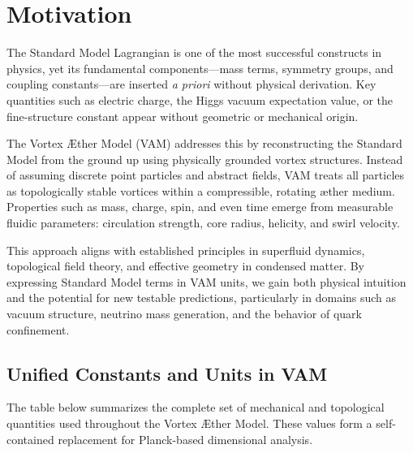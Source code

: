 
\section{Motivation}
The Standard Model Lagrangian is one of the most successful constructs in physics, yet its fundamental components—mass terms, symmetry groups, and coupling constants—are inserted \textit{a priori} without physical derivation. Key quantities such as electric charge, the Higgs vacuum expectation value, or the fine-structure constant appear without geometric or mechanical origin.

The Vortex Æther Model (VAM) addresses this by reconstructing the Standard Model from the ground up using physically grounded vortex structures. Instead of assuming discrete point particles and abstract fields, VAM treats all particles as topologically stable vortices within a compressible, rotating æther medium. Properties such as mass, charge, spin, and even time emerge from measurable fluidic parameters: circulation strength, core radius, helicity, and swirl velocity.

This approach aligns with established principles in superfluid dynamics, topological field theory, and effective geometry in condensed matter. By expressing Standard Model terms in VAM units, we gain both physical intuition and the potential for new testable predictions, particularly in domains such as vacuum structure, neutrino mass generation, and the behavior of quark confinement.

\subsection*{Unified Constants and Units in VAM}

The table below summarizes the complete set of mechanical and topological quantities used throughout the Vortex Æther Model. These values form a self-contained replacement for Planck-based dimensional analysis.


